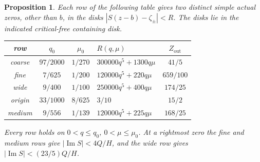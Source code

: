 \documentclass[11pt,reqno]{amsart}
\numberwithin{equation}{section}
\newtheorem{proposition}[theorem]{Proposition}
\theoremstyle{definition}
\theoremstyle{remark}
\renewcommand{\Im}{\operatorname{Im}}
\begin{document}
\begin{proposition}\label{lt:quartic}\label{lt:fine200}\label{lt:wideD100}
Each row of the following table gives two distinct simple actual zeros,
other than $b$, in the disks $|S(z-b)-\zeta_\pm|<R$.
The disks lie in the indicated critical-free containing disk.
\begin{center}\small
\begin{tabular}{ccclc}
\toprule
row&$q_0$&$\mu_0$&$R(q,\mu)$&$Z_{\mathrm{out}}$\\\midrule
coarse&$97/2000$&$1/270$&$300000q^5+1300q\mu$&$41/5$\\
fine&$7/625$&$1/200$&$120000q^5+220q\mu$&$659/100$\\
wide&$9/400$&$1/100$&$250000q^5+400q\mu$&$174/25$\\
origin&$33/1000$&$8/625$&$3/10$&$15/2$\\
medium&$9/556$&$1/139$&$120000q^5+225q\mu$&$168/25$\\\bottomrule
\end{tabular}
\end{center}
Every row holds on $0<q\le q_0$, $0<\mu\le\mu_0$.
At a rightmost zero the fine and medium rows give
$|\Im S|<4Q/H$, and the wide row gives $|\Im S|<(23/5)Q/H$.
\end{proposition}
\end{document}

